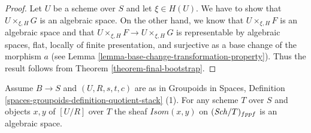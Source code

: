 \begin{proof}
Let $U$ be a scheme over $S$ and let $\xi \in H(U)$. We have to show that
$U \times_{\xi, H} G$ is an algebraic space. On the other hand, we know
that $U \times_{\xi, H} F$ is an algebraic space and that
$U \times_{\xi, H} F \to U \times_{\xi, H} G$ is representable by
algebraic spaces, flat, locally of finite presentation, and surjective
as a base change of the morphism $a$ (see
Lemma \ref{lemma-base-change-transformation-property}).
Thus the result follows from Theorem \ref{theorem-final-bootstrap}.
\end{proof}

\begin{lemma}
\label{lemma-quotient-stack-isom}
Assume $B \to S$ and $(U, R, s, t, c)$ are as in
Groupoids in Spaces,
Definition \ref{spaces-groupoids-definition-quotient-stack} (1).
For any scheme $T$ over $S$ and objects $x, y$ of $[U/R]$ over $T$
the sheaf $\mathit{Isom}(x, y)$ on $(\mathit{Sch}/T)_{fppf}$
is an algebraic space.
\end{lemma}

